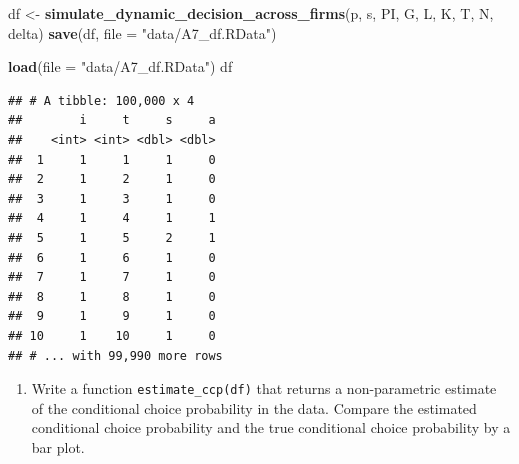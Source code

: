 \documentclass[]{book}
\newenvironment{Shaded}{\begin{snugshade}}{\end{snugshade}}
\newcommand{\KeywordTok}[1]{\textcolor[rgb]{0.13,0.29,0.53}{\textbf{#1}}}
\newcommand{\DataTypeTok}[1]{\textcolor[rgb]{0.13,0.29,0.53}{#1}}
\newcommand{\StringTok}[1]{\textcolor[rgb]{0.31,0.60,0.02}{#1}}
\newcommand{\NormalTok}[1]{#1}
\providecommand{\tightlist}{%
  \setlength{\itemsep}{0pt}\setlength{\parskip}{0pt}}
\begin{document}
\begin{Shaded}
\begin{Highlighting}[]
\NormalTok{df <-}\StringTok{ }\KeywordTok{simulate_dynamic_decision_across_firms}\NormalTok{(p, s, PI, G, L, K, T, N, delta)}
\KeywordTok{save}\NormalTok{(df, }\DataTypeTok{file =} \StringTok{"data/A7_df.RData"}\NormalTok{)}
\end{Highlighting}
\end{Shaded}

\begin{Shaded}
\begin{Highlighting}[]
\KeywordTok{load}\NormalTok{(}\DataTypeTok{file =} \StringTok{"data/A7_df.RData"}\NormalTok{)}
\NormalTok{df}
\end{Highlighting}
\end{Shaded}

\begin{verbatim}
## # A tibble: 100,000 x 4
##        i     t     s     a
##    <int> <int> <dbl> <dbl>
##  1     1     1     1     0
##  2     1     2     1     0
##  3     1     3     1     0
##  4     1     4     1     1
##  5     1     5     2     1
##  6     1     6     1     0
##  7     1     7     1     0
##  8     1     8     1     0
##  9     1     9     1     0
## 10     1    10     1     0
## # ... with 99,990 more rows
\end{verbatim}

\begin{enumerate}
\def\labelenumi{\arabic{enumi}.}
\setcounter{enumi}{7}
\tightlist
\item
  Write a function \texttt{estimate\_ccp(df)} that returns a
  non-parametric estimate of the conditional choice probability in the
  data. Compare the estimated conditional choice probability and the
  true conditional choice probability by a bar plot.
\end{enumerate}
\end{document}
